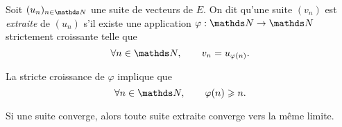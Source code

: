 \begin{defn}
	Soit $(u_n)_{n\in\N}$\/ une suite de vecteurs de $E$. On dit qu'une suite $(v_n)$\/ est \textit{extraite} de $(u_n)$\/ s'il existe une application $\varphi : \N \to \N$\/ strictement croissante telle que \[
		\forall n \in \N,\quad\quad v_n = u_{\varphi(n)}
	.\]
\end{defn}

La stricte croissance de $\varphi$\/ implique que \[
	\forall n \in \N, \quad\quad \varphi(n) \ge n
.\]

\begin{prop}
	Si une suite converge, alors toute suite extraite converge vers la même limite.
\end{prop}
